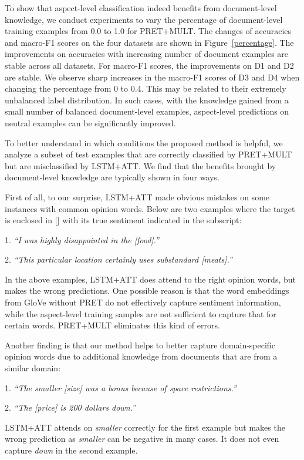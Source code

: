\documentclass[11pt,a4paper]{article}
\begin{document}
To show that aspect-level classification indeed benefits from document-level knowledge, we conduct experiments to vary the percentage of document-level training examples from 0.0 to 1.0 for PRET+MULT. The changes of accuracies and macro-F1 scores on the four datasets are shown in Figure~\ref{percentage}. The improvements on accuracies with increasing number of document examples are stable across all datasets. For macro-F1 scores, the improvements on D1 and D2 are stable. We observe sharp increases in the macro-F1 scores of D3 and D4 when changing the percentage from 0 to 0.4. This may be related to their extremely unbalanced label distribution. In such cases, with the knowledge gained from a small number of balanced document-level examples, aspect-level predictions on neutral examples can be significantly improved. 

To better understand in which conditions the proposed method is helpful, we analyze a subset of test examples that are correctly classified by PRET+MULT but are misclassified by LSTM+ATT. We find that the benefits brought by document-level knowledge are typically shown in four ways.

First of all, to our surprise, LSTM+ATT made obvious mistakes on some instances with common opinion words. Below are two examples where the target is enclosed in [] with its true sentiment indicated in the subscript:

1. \emph{``I was highly disappointed in the [food].''}

2. \emph{``This particular location certainly uses substandard [meats].''}

In the above examples, LSTM+ATT does attend to the right opinion words, but makes the wrong predictions. One possible reason is that the word embeddings from GloVe without PRET do not effectively capture sentiment information, while the aspect-level training samples are not sufficient to capture that for certain words. PRET+MULT eliminates this kind of errors.

Another finding is that our method helps to better capture domain-specific opinion words due to additional knowledge from documents that are from a similar domain:

1. \emph{``The smaller [size] was a bonus because of space restrictions.''}

2. \emph{``The [price] is 200 dollars down.''}

LSTM+ATT attends on \emph{smaller} correctly for the first example but makes the wrong prediction as \emph{smaller} can be negative in many cases. It does not even capture \emph{down} in the second example.
\end{document}
